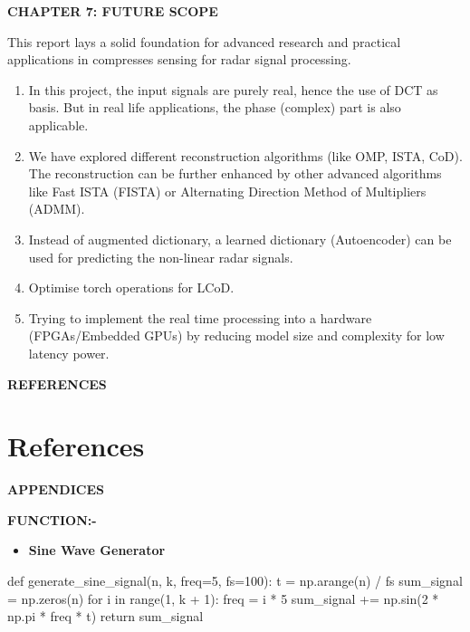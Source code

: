 \documentclass[
  letterpaper,
  DIV=11,
  numbers=noendperiod]{scrartcl}
\newenvironment{Shaded}{\begin{snugshade}}{\end{snugshade}}
\newcommand{\BuiltInTok}[1]{\textcolor[rgb]{0.40,0.85,0.94}{#1}}
\newcommand{\ControlFlowTok}[1]{\textcolor[rgb]{0.98,0.15,0.45}{#1}}
\newcommand{\DecValTok}[1]{\textcolor[rgb]{0.68,0.51,1.00}{#1}}
\newcommand{\KeywordTok}[1]{\textcolor[rgb]{0.98,0.15,0.45}{#1}}
\newcommand{\NormalTok}[1]{\textcolor[rgb]{0.97,0.97,0.95}{#1}}
\newcommand{\OperatorTok}[1]{\textcolor[rgb]{0.97,0.97,0.95}{#1}}
\providecommand{\tightlist}{%
  \setlength{\itemsep}{0pt}\setlength{\parskip}{0pt}}
\providecommand{\mainsection}[1]{\begin{center}{\rmfamily\textbf{\fontsize{14}{20}\selectfont #1}}\end{center}}
\begin{document}
\newpage

\mainsection{CHAPTER 7: FUTURE SCOPE}

This report lays a solid foundation for advanced research and practical
applications in compresses sensing for radar signal processing.

\begin{enumerate}
\def\labelenumi{\arabic{enumi}.}
\item
  In this project, the input signals are purely real, hence the use of
  DCT as basis. But in real life applications, the phase (complex) part
  is also applicable.
\item
  We have explored different reconstruction algorithms (like OMP, ISTA,
  CoD). The reconstruction can be further enhanced by other advanced
  algorithms like Fast ISTA (FISTA) or Alternating Direction Method of
  Multipliers (ADMM).
\item
  Instead of augmented dictionary, a learned dictionary (Autoencoder)
  can be used for predicting the non-linear radar signals.
\item
  Optimise torch operations for LCoD.
\item
  Trying to implement the real time processing into a hardware
  (FPGAs/Embedded GPUs) by reducing model size and complexity for low
  latency power.
\end{enumerate}

\newpage

\mainsection{REFERENCES}

\section{References}\label{references}

\printbibliography[heading=none]

\newpage

\mainsection{APPENDICES}

\textbf{FUNCTION:-}

\begin{itemize}
\tightlist
\item
  \textbf{Sine Wave Generator}
\end{itemize}

\begin{Shaded}
\begin{Highlighting}[]
\KeywordTok{def}\NormalTok{ generate\_sine\_signal(n, k, freq}\OperatorTok{=}\DecValTok{5}\NormalTok{, fs}\OperatorTok{=}\DecValTok{100}\NormalTok{):}
\NormalTok{    t }\OperatorTok{=}\NormalTok{ np.arange(n) }\OperatorTok{/}\NormalTok{ fs}
\NormalTok{    sum\_signal }\OperatorTok{=}\NormalTok{ np.zeros(n)}
    \ControlFlowTok{for}\NormalTok{ i }\KeywordTok{in} \BuiltInTok{range}\NormalTok{(}\DecValTok{1}\NormalTok{, k }\OperatorTok{+} \DecValTok{1}\NormalTok{):}
\NormalTok{        freq }\OperatorTok{=}\NormalTok{ i }\OperatorTok{*} \DecValTok{5}
\NormalTok{        sum\_signal }\OperatorTok{+=}\NormalTok{ np.sin(}\DecValTok{2} \OperatorTok{*}\NormalTok{ np.pi }\OperatorTok{*}\NormalTok{ freq }\OperatorTok{*}\NormalTok{ t)}
    \ControlFlowTok{return}\NormalTok{ sum\_signal}
\end{Highlighting}
\end{Shaded}
\end{document}

